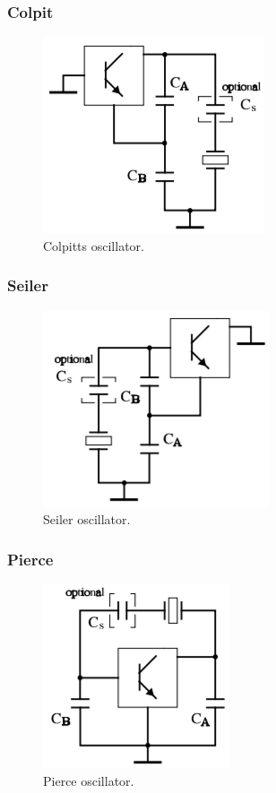 \subsubsection{Colpit}
\begin{figure} [H]
	\centering
	\includegraphics[width=0.45\linewidth]{graphics/45.png}
	\caption{Colpitts oscillator.}
	\label{fig:45}
\end{figure}

\subsubsection{Seiler}
\begin{figure} [H]
	\centering
	\includegraphics[width=0.45\linewidth]{graphics/46.png}
	\caption{Seiler oscillator.}
	\label{fig:46}
\end{figure}

\subsubsection{Pierce}
\begin{figure} [H]
	\centering
	\includegraphics[width=0.4\linewidth]{graphics/47.png}
	\caption{Pierce oscillator.}
	\label{fig:47}
\end{figure}